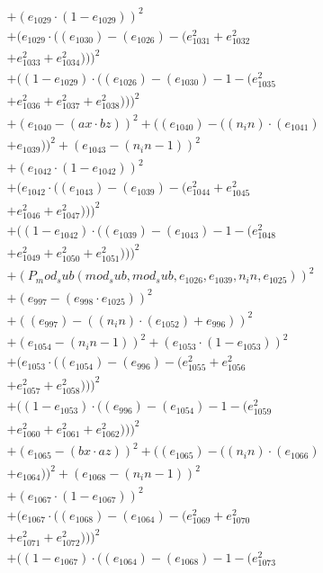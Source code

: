 \documentclass[10pt, a4paper]{article}
\begin{document}
\begin{small}
\begin{align*}
& + (e_{1029}  \cdot  (1 - e_{1029}))^{2} \\
& + (e_{1029}  \cdot  ((e_{1030}) - (e_{1026}) - (e_{1031}^{2} + e_{1032}^{2} \\
& + e_{1033}^{2} + e_{1034}^{2})))^{2} \\
& + ((1 - e_{1029})  \cdot  ((e_{1026}) - (e_{1030}) - 1 - (e_{1035}^{2} \\
& + e_{1036}^{2} + e_{1037}^{2} + e_{1038}^{2})))^{2} \\
& + (e_{1040} - (ax  \cdot  bz))^{2} + ((e_{1040}) - ((n_in)  \cdot  (e_{1041}) \\
& + e_{1039}))^{2} + (e_{1043} - (n_in - 1))^{2} \\
& + (e_{1042}  \cdot  (1 - e_{1042}))^{2} \\
& + (e_{1042}  \cdot  ((e_{1043}) - (e_{1039}) - (e_{1044}^{2} + e_{1045}^{2} \\
& + e_{1046}^{2} + e_{1047}^{2})))^{2} \\
& + ((1 - e_{1042})  \cdot  ((e_{1039}) - (e_{1043}) - 1 - (e_{1048}^{2} \\
& + e_{1049}^{2} + e_{1050}^{2} + e_{1051}^{2})))^{2} \\
& + (P_mod_sub(mod_sub, mod_sub, e_{1026}, e_{1039}, n_in, e_{1025}))^{2} \\
& + (e_{997} - (e_{998}  \cdot  e_{1025}))^{2} \\
& + ((e_{997}) - ((n_in)  \cdot  (e_{1052}) + e_{996}))^{2} \\
& + (e_{1054} - (n_in - 1))^{2} + (e_{1053}  \cdot  (1 - e_{1053}))^{2} \\
& + (e_{1053}  \cdot  ((e_{1054}) - (e_{996}) - (e_{1055}^{2} + e_{1056}^{2} \\
& + e_{1057}^{2} + e_{1058}^{2})))^{2} \\
& + ((1 - e_{1053})  \cdot  ((e_{996}) - (e_{1054}) - 1 - (e_{1059}^{2} \\
& + e_{1060}^{2} + e_{1061}^{2} + e_{1062}^{2})))^{2} \\
& + (e_{1065} - (bx  \cdot  az))^{2} + ((e_{1065}) - ((n_in)  \cdot  (e_{1066}) \\
& + e_{1064}))^{2} + (e_{1068} - (n_in - 1))^{2} \\
& + (e_{1067}  \cdot  (1 - e_{1067}))^{2} \\
& + (e_{1067}  \cdot  ((e_{1068}) - (e_{1064}) - (e_{1069}^{2} + e_{1070}^{2} \\
& + e_{1071}^{2} + e_{1072}^{2})))^{2} \\
& + ((1 - e_{1067})  \cdot  ((e_{1064}) - (e_{1068}) - 1 - (e_{1073}^{2} \\

\end{align*}
\end{small}
\end{document}

